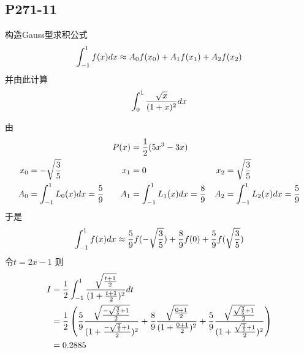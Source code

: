 \subsection{P271-11}
构造Gauss型求积公式
\begin{displaymath}
\int_{-1}^{1} {f(x)} d{x} \approx A_0 f(x_0) + A_1 f(x_1) + A_2 f(x_2)
\end{displaymath}
并由此计算
\begin{displaymath}
\int_{0}^{1} {\frac{\sqrt{x}}{(1+x)^2}} d{x}
\end{displaymath}
\begin{SOLVE}
由
\begin{align*}
&& P(x) & = \frac{1}{2}(5 x^3 - 3 x) && \\
x_0 & = -\sqrt{\frac{3}{5}} &
x_1 & = 0 &
x_2 & = \sqrt{\frac{3}{5}} \\
A_0 & = \int_{-1}^{1} {L_0(x)} d{x} = \frac{5}{9} &
A_1 & = \int_{-1}^{1} {L_1(x)} d{x} = \frac{8}{9} &
A_2 & = \int_{-1}^{1} {L_2(x)} d{x} = \frac{5}{9}
\end{align*}
于是
\begin{displaymath}
\int_{-1}^{1} {f(x)} d{x} \approx \frac{5}{9} f(-\sqrt{\frac{3}{5}}) + \frac{8}{9} f(0) + \frac{5}{9} f(\sqrt{\frac{3}{5}})
\end{displaymath}
令$t = 2x - 1$
则
\begin{align*}
I & = \frac{1}{2} \int_{-1}^{1} {\frac{\sqrt{\frac{t+1}{2}}}{(1+\frac{t+1}{2})^2}} d{t} \\
  & = \frac{1}{2} \left( \frac{5}{9} \frac{\sqrt{\frac{-\sqrt{\frac{3}{5}}+1}{2}}}{(1+\frac{-\sqrt{\frac{3}{5}}+1}{2})^2} + \frac{8}{9} \frac{\sqrt{\frac{0+1}{2}}}{(1+\frac{0+1}{2})^2} + \frac{5}{9} \frac{\sqrt{\frac{\sqrt{\frac{3}{5}}+1}{2}}}{(1+\frac{\sqrt{\frac{3}{5}}+1}{2})^2} \right) \\
  & = 0.2885
\end{align*}
\end{SOLVE}